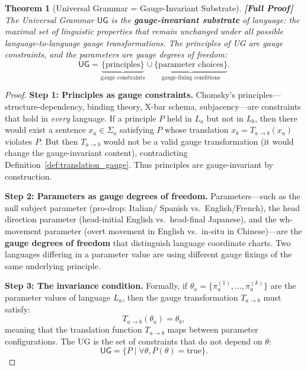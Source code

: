\documentclass[12pt,a4paper]{article}
\newtheorem{theorem}{Theorem}[section]
\theoremstyle{remark}
\newcommand{\UG}{\textsf{UG}}
\newcommand{\rigorFull}{\textbf{[Full Proof]}}
\begin{document}
\begin{theorem}[Universal Grammar = Gauge-Invariant Substrate]
\label{thm:ug_invariant}
\rigorFull
The Universal Grammar $\UG$ is the \textbf{gauge-invariant substrate}
of language: the maximal set of linguistic properties that remain
unchanged under all possible language-to-language gauge transformations.
The principles of UG are gauge constraints, and the parameters are
gauge degrees of freedom:
\begin{equation}
  \label{eq:principles_parameters}
  \UG = \underbrace{\{\text{principles}\}}_{\text{gauge constraints}} \cup
  \underbrace{\{\text{parameter choices}\}}_{\text{gauge-fixing conditions}}.
\end{equation}
\end{theorem}

\begin{proof}
\noindent\textbf{Step 1: Principles as gauge constraints.}
Chomsky's principles---structure-dependency, binding theory, X-bar
schema, subjacency---are constraints that hold in \emph{every} language.
If a principle $P$ held in $L_a$ but not in $L_b$, then there would
exist a sentence $x_a \in \Sigma_a$ satisfying $P$ whose translation
$x_b = T_{a\to b}(x_a)$ violates $P$. But then $T_{a\to b}$ would
not be a valid gauge transformation (it would change the gauge-invariant
content), contradicting Definition~\ref{def:translation_gauge}.
Thus principles are gauge-invariant by construction.

\smallskip
\noindent\textbf{Step 2: Parameters as gauge degrees of freedom.}
Parameters---such as the null subject parameter (pro-drop:
Italian/ Spanish vs.\ English/French), the head direction parameter
(head-initial English vs.\ head-final Japanese), and the wh-movement
parameter (overt movement in English vs.\ in-situ in Chinese)---are
the \textbf{gauge degrees of freedom} that distinguish language
coordinate charts. Two languages differing in a parameter value
are using different gauge fixings of the same underlying principle.

\smallskip
\noindent\textbf{Step 3: The invariance condition.}
Formally, if $\theta_a = \{\pi_a^{(1)}, \ldots, \pi_a^{(k)}\}$ are
the parameter values of language $L_a$, then the gauge transformation
$T_{a\to b}$ must satisfy:
\begin{equation}
  T_{a\to b}(\theta_a) = \theta_b,
\end{equation}
meaning that the translation function $T_{a\to b}$ maps between
parameter configurations. The UG is the set of constraints that
do not depend on $\theta$:
\begin{equation}
  \UG = \{P \mid \forall \theta, P(\theta) = \text{true}\}.
\end{equation}
\end{proof}
\end{document}
